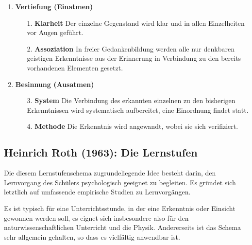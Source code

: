 \begin{enumerate}
	\item
	{\bf Vertiefung (Einatmen)}
	\begin{enumerate}
		\item[1.]
		{\bf Klarheit} Der einzelne Gegenstand wird klar und in allen
		Einzelheiten vor Augen gef\"{u}hrt.
		\item[2.]
		{\bf Assoziation} In freier Gedankenbildung werden alle nur
		denkbaren geistigen Erkenntnisse aus der Erinnerung in
		Verbindung zu den bereits vorhandenen Elementen gesetzt.
	\end{enumerate}

	\item {\bf Besinnung (Ausatmen)}
	\begin{enumerate}
		\item [3.]
		{\bf System} Die Verbindung des erkannten einzelnen zu den
		bisherigen Erkenntnissen wird systematisch aufbereitet, eine
		Einordnung findet statt.
		\item[4.]
		{\bf Methode} Die Erkenntnis wird angewandt, wobei sie sich
		verifiziert.
	\end{enumerate}
\end{enumerate}


\subsection{Heinrich Roth (1963): Die Lernstufen}
Die diesem Lernstufenschema zugrundeliegende Idee besteht
darin, den Lernvorgang des Sch\"{u}lers psychologisch geeignet zu
begleiten. Es gr\"{u}ndet sich letztlich auf umfassende empirische
Studien zu Lernvorg\"{a}ngen.

\mip
Es ist typisch f\"{u}r eine Unterrichtsstunde,
in der eine Erkenntnis oder Einsicht gewonnen werden soll, es
eignet sich insbesondere also f\"{u}r den naturwissenschaftlichen
Unterricht und die Physik.
Andererseits ist das Schema sehr allgemein gehalten, so dass es
vielf\"{a}ltig anwendbar ist.

